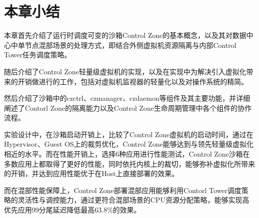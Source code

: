 \section{本章小结}


本章首先介绍了运行时调度可变的沙箱Control Zone的基本概念，以及其对数据中心中单节点混部场景的处理方式，即结合外侧虚拟机资源隔离与内部Control Tower任务调度策略。

随后介绍了Control Zone轻量级虚拟机的实现，以及在实现中为解决引入虚拟化带来的开销做进行的工作，包括对虚拟机监视器的轻量化以及对操作系统的精简。

然后介绍了沙箱中的czctrl、czmanager、czdaemon等组件及其主要功能，并详细阐述了Contorl Zone的隔离能力以及Control Zone生命周期管理中各个组件的协作流程。

实验设计中，在沙箱启动开销上，比较了Control Zone虚拟机的启动时间，通过在Hypervisor、Guest OS上的裁剪优化，Control Zone能够达到与领先轻量级虚拟化相近的水平。而在性能开销上，选择6种应用进行性能测试，Control Zone沙箱在多数应用上都取得了更好的性能，同时依托内核上的裁切，能够弥补虚拟化所带来的开销，并达到应用性能优于在Host上直接部署的效果。

而在混部性能保障上，Control Zone部署混部应用能够利用Contorl Tower调度策略的灵活性与调控能力，通过更符合混部场景的CPU资源分配策略，能够实现高优先应用99分尾延迟降低最高63.8\%的效果。